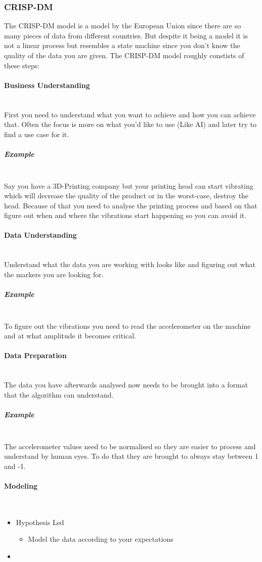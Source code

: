 \documentclass{article}
\newcommand{\subparagraphlb}[1]{\subparagraph{#1}\mbox{}\\}
\newcommand{\paragraphlb}[1]{\paragraph{#1}\mbox{}\\}
\begin{document}
	\subsubsection{CRISP-DM}
	The CRISP-DM model is a model by the European Union since there are so many pieces of data from different countries. But despite it being a model it is not a linear process but resembles a state machine since you don't know the quality of the data you are given. The CRISP-DM model roughly constists of these steps:
	\paragraphlb{Business Understanding}
	First you need to understand what you want to achieve and how you can achieve that. Often the focus is more on what you'd like to use (Like AI) and later try to find a use case for it.
	\subparagraphlb{Example}
	Say you have a 3D-Printing company but your printing head can start vibrating which will decrease the quality of the product or in the worst-case, destroy the head. Because of that you need to analyse the printing process and based on that figure out when and where the vibrations start happening so you can avoid it.
	\paragraphlb{Data Understanding}
	Understand what the data you are working with looks like and figuring out what the markers you are looking for.
	\subparagraphlb{Example}
	To figure out the vibrations you need to read the accelerometer on the machine and at what amplitude it becomes critical.
	\paragraphlb{Data Preparation}
	The data you have afterwards analysed now needs to be brought into a format that the algorithm can understand.
	\subparagraphlb{Example}
	The accelerometer values need to be normalised so they are easier to process and understand by human eyes. To do that they are brought to always stay between 1 and -1.
	\paragraphlb{Modeling}
	\begin{itemize}
		\item{Hypothesis Led}
		\begin{itemize}
			\item{Model the data according to your expectations}
		\end{itemize}
		\item{}
	\end{itemize}
\end{document}

